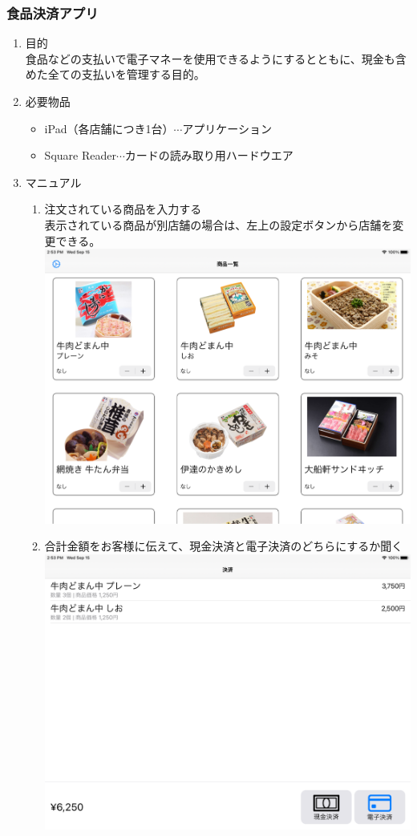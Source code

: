 \documentclass[dvipdfmx,jb5]{jarticle}
\begin{document}
 \subsubsection{食品決済アプリ}
  \begin{enumerate}
   \item 目的\\
   食品などの支払いで電子マネーを使用できるようにするとともに、現金も含めた全ての支払いを管理する目的。
   \item 必要物品
   \begin{itemize}
   \item iPad（各店舗につき1台）$\cdots$アプリケーション
   \item Square Reader$\cdots$カードの読み取り用ハードウエア
   \end{itemize}
   \item マニュアル
   \begin{enumerate}
   \item 注文されている商品を入力する\\
   表示されている商品が別店舗の場合は、左上の設定ボタンから店舗を変更できる。\\
   \includegraphics[scale=0.2]{assets/square_top-interface.png}
   \item 合計金額をお客様に伝えて、現金決済と電子決済のどちらにするか聞く\\
   \includegraphics[scale=0.2]{assets/square_second-interface.png}

\end{enumerate}
\end{enumerate}
\end{document}
